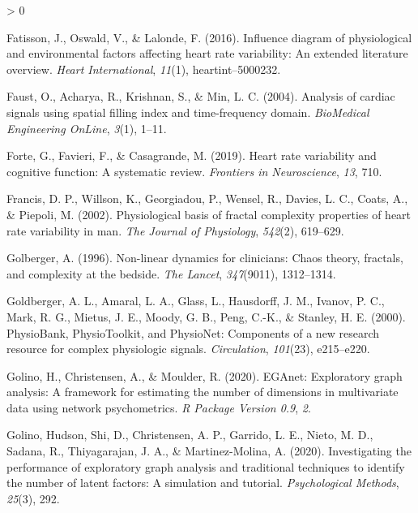 \documentclass[
  english,
  jou,floatsintext]{apa6}
\newlength{\cslhangindent}
\newenvironment{CSLReferences}[2] %
 {%
  \setlength{\parindent}{0pt}
  \ifodd #1 \everypar{\setlength{\hangindent}{\cslhangindent}}\ignorespaces\fi
  \ifnum #2 > 0
  \setlength{\parskip}{#2\baselineskip}
  \fi
 }%
 {}
\begin{document}
\begin{CSLReferences}{1}{0}
\leavevmode\hypertarget{ref-fatisson2016influence}{}%
Fatisson, J., Oswald, V., \& Lalonde, F. (2016). Influence diagram of physiological and environmental factors affecting heart rate variability: An extended literature overview. \emph{Heart International}, \emph{11}(1), heartint--5000232.

\leavevmode\hypertarget{ref-faust2004analysis}{}%
Faust, O., Acharya, R., Krishnan, S., \& Min, L. C. (2004). Analysis of cardiac signals using spatial filling index and time-frequency domain. \emph{BioMedical Engineering OnLine}, \emph{3}(1), 1--11.

\leavevmode\hypertarget{ref-forte2019heart}{}%
Forte, G., Favieri, F., \& Casagrande, M. (2019). Heart rate variability and cognitive function: A systematic review. \emph{Frontiers in Neuroscience}, \emph{13}, 710.

\leavevmode\hypertarget{ref-francis2002physiological}{}%
Francis, D. P., Willson, K., Georgiadou, P., Wensel, R., Davies, L. C., Coats, A., \& Piepoli, M. (2002). Physiological basis of fractal complexity properties of heart rate variability in man. \emph{The Journal of Physiology}, \emph{542}(2), 619--629.

\leavevmode\hypertarget{ref-golberger1996non}{}%
Golberger, A. (1996). Non-linear dynamics for clinicians: Chaos theory, fractals, and complexity at the bedside. \emph{The Lancet}, \emph{347}(9011), 1312--1314.

\leavevmode\hypertarget{ref-goldberger2000physiobank}{}%
Goldberger, A. L., Amaral, L. A., Glass, L., Hausdorff, J. M., Ivanov, P. C., Mark, R. G., Mietus, J. E., Moody, G. B., Peng, C.-K., \& Stanley, H. E. (2000). PhysioBank, PhysioToolkit, and PhysioNet: Components of a new research resource for complex physiologic signals. \emph{Circulation}, \emph{101}(23), e215--e220.

\leavevmode\hypertarget{ref-golino2020eganet}{}%
Golino, H., Christensen, A., \& Moulder, R. (2020). EGAnet: Exploratory graph analysis: A framework for estimating the number of dimensions in multivariate data using network psychometrics. \emph{R Package Version 0.9}, \emph{2}.

\leavevmode\hypertarget{ref-golino2020investigating}{}%
Golino, Hudson, Shi, D., Christensen, A. P., Garrido, L. E., Nieto, M. D., Sadana, R., Thiyagarajan, J. A., \& Martinez-Molina, A. (2020). Investigating the performance of exploratory graph analysis and traditional techniques to identify the number of latent factors: A simulation and tutorial. \emph{Psychological Methods}, \emph{25}(3), 292.


\end{CSLReferences}
\end{document}
